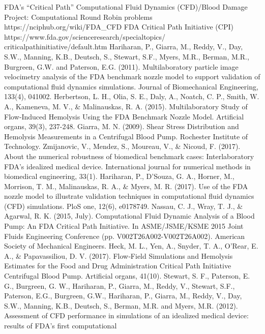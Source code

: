 FDA’s ``Critical Path'' Computational Fluid Dynamics (CFD)/Blood Damage Project: Computational Round Robin problems
https://nciphub.org/wiki/FDA\_CFD
 FDA Critical Path Initiative (CPI) \\https://www.fda.gov/scienceresearch/specialtopics/\\criticalpathinitiative/default.htm
 Hariharan, P., Giarra, M., Reddy, V., Day, S.W.,
Manning, K.B., Deutsch, S., Stewart, S.F., Myers, M.R., Berman, M.R., Burgreen, G.W. and Paterson, E.G. (2011).
Multilaboratory particle image velocimetry analysis of the FDA benchmark nozzle model to support validation of computational
fluid dynamics simulations. Journal of Biomechanical Engineering, 133(4), 041002.
 Herbertson, L. H., Olia, S. E., Daly, A., Noatch, C. P., Smith, W. A., Kameneva, M. V., \& Malinauskas, R. A. (2015).
Multilaboratory Study of Flow‐Induced Hemolysis Using the FDA Benchmark Nozzle Model. Artificial organs, 39(3), 237-248.
 Giarra, M. N. (2009). Shear Stress Distribution and Hemolysis Measurements in a Centrifugal Blood Pump. Rochester Institute of
Technology.
 Zmijanovic, V., Mendez, S., Moureau, V., \& Nicoud, F. (2017). About the numerical robustness of biomedical benchmark cases:
Interlaboratory FDA's idealized medical device. International journal for numerical methods in biomedical engineering, 33(1).
 Hariharan, P., D’Souza, G. A., Horner, M., Morrison, T. M., Malinauskas, R. A., \& Myers, M. R. (2017). Use of the FDA nozzle
model to illustrate validation techniques in computational fluid dynamics (CFD) simulations. PloS one, 12(6), e0178749.
 Nassau, C. J., Wray, T. J., \& Agarwal, R. K. (2015, July). Computational Fluid Dynamic Analysis of a Blood Pump: An FDA
Critical Path Initiative. In ASME/JSME/KSME 2015 Joint Fluids Engineering Conference (pp. V002T26A002-V002T26A002).
American Society of Mechanical Engineers.
 Heck, M. L., Yen, A., Snyder, T. A., O'Rear, E. A., \& Papavassiliou, D. V. (2017). Flow‐Field Simulations and Hemolysis
Estimates for the Food and Drug Administration Critical Path Initiative Centrifugal Blood Pump. Artificial organs, 41(10).
 Stewart, S. F., Paterson, E. G., Burgreen, G. W., Hariharan, P., Giarra, M., Reddy, V., Stewart, S.F., Paterson, E.G., Burgreen,
G.W., Hariharan, P., Giarra, M., Reddy, V., Day, S.W., Manning, K.B., Deutsch, S., Berman, M.R. and Myers, M.R. (2012).
Assessment of CFD performance in simulations of an idealized medical device: results of FDA’s first computational
